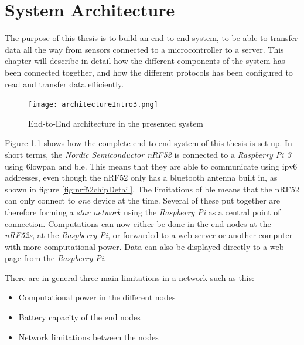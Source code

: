 \chapter{System Architecture}
\label{chp:architecture} 

The purpose of this thesis is to build an end-to-end system, to be able to transfer data all the way from sensors connected to a \gls{microcontroller} to a server. This chapter will describe in detail how the different components of the system has been connected together, and how the different protocols has been configured to read and transfer data efficiently. 

\begin{figure}[ht]
    \centering
    \texttt{[image: architectureIntro3.png]}    
    \caption{End-to-End architecture in the presented system}
    \label{fig:systemArchitectureThisSystem}
\end{figure}


Figure \ref{fig:systemArchitectureThisSystem} shows how the complete end-to-end system of this thesis is set up. In short terms, the \textit{Nordic Semiconductor nRF52} is connected to a  \textit{Raspberry Pi 3} using \gls{6lowpan} and \gls{ble}. This means that they are able to communicate using \gls{ipv6} addresses, even though the nRF52 only has a bluetooth antenna built in, as shown in figure \ref{fig:nrf52chipDetail}. The limitations of \gls{ble} means that the nRF52 can only connect to \textit{one} device at the time. Several of these put together are therefore forming a \textit{star network} using the \textit{Raspberry Pi} as a central point of connection. Computations can now either be done in the end nodes at the \textit{nRF52s}, at the \textit{Raspberry Pi}, or forwarded to a web server or another computer with more computational power. Data can also be displayed directly to a web page from the \textit{Raspberry Pi}. 
 



There are in general three main limitations in a network such as this:

\begin{itemize}
  \item Computational power in the different nodes
  \item Battery capacity of the end nodes
  \item Network limitations between the nodes
\end{itemize}

